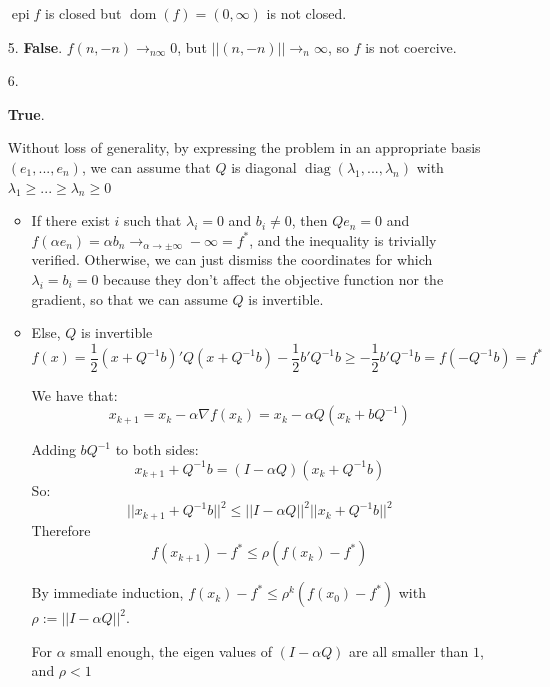 \documentclass[12pt]{article}
\DeclareMathOperator{\epi}{epi}
\DeclareMathOperator{\dom}{dom}
\DeclareMathOperator{\diag}{diag}
\begin{document}
\begin{enumerate}
  $\epi f$ is closed but  $\dom(f) = (0, \infty)$ is not closed.

\item[5.]
  \textbf{False}.
  $f(n, -n) \rightarrow_{n \infty} 0$, but $||(n, -n)|| \rightarrow_n \infty$, so $f$ is not coercive.


\item[6.]
  
  \textbf{True}.

  Without loss of generality, by expressing the problem in an appropriate basis $(e_1, ..., e_n)$, we can assume that $Q$ is diagonal $\diag(\lambda_1, ... , \lambda_n)$ with $\lambda_1 \ge ... \ge \lambda_n \ge 0$
  
  \begin{itemize}
  \item If there exist $i$ such that $\lambda_i = 0$ and $b_i \ne 0$, then $Qe_n = 0$ and $f(\alpha e_n) = \alpha b_n \rightarrow_{\alpha \rightarrow \pm \infty} -\infty = f^*$, and the inequality is trivially verified.
    Otherwise, we can just dismiss the coordinates for which $\lambda_i = b_i = 0$ because they don't affect the objective function nor the gradient, so that we can assume $Q$ is invertible.
  \item Else, $Q$ is invertible
    $$f(x) = \frac12 (x+Q^{-1}b)'Q(x+Q^{-1}b) - \frac12 b'Q^{-1}b \ge - \frac12 b'Q^{-1}b = f(-Q^{-1}b) = f^* $$

    We have that:
    $$x_{k+1} = x_k - \alpha \nabla f(x_k)
    = x_k - \alpha Q(x_k+bQ^{-1})$$

    Adding $bQ^{-1}$ to both sides:
    $$x_{k+1}+Q^{-1}b = (I - \alpha Q) (x_k +Q^{-1}b)$$
    So:
    $$||x_{k+1}+Q^{-1}b||^2 \le ||I-\alpha Q||^2 ||x_k + Q^{-1}b||^2$$
    Therefore
    $$f(x_{k+1}) - f^* \le \rho (f(x_k) - f^*)$$

    By immediate induction, $f(x_k) - f^* \le \rho^k (f(x_0) - f^*)$ with $\rho := ||I-\alpha Q||^2$.
    
    For $\alpha$ small enough, the eigen values of $(I - \alpha Q)$ are all smaller than $1$, and $\rho < 1$
  \end{itemize}
  
\end{enumerate}
\end{document}
